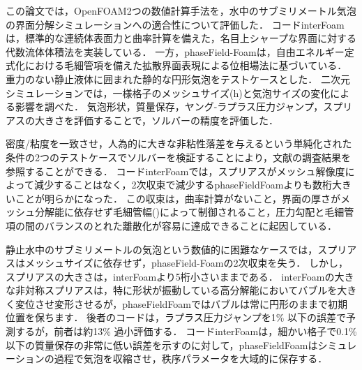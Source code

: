 この論文では，OpenFOAM2つの数値計算手法を，水中のサブミリメートル気泡の界面分解シミュレーションへの適合性について評価した．
コードinterFoamは，標準的な連続体表面力と曲率計算を備えた，名目上シャープな界面に対する代数流体体積法を実装している．
一方，phaseField-Foamは，自由エネルギー定式化における毛細管項を備えた拡散界面表現による位相場法に基づいている．
重力のない静止液体に囲まれた静的な円形気泡をテストケースとした．
二次元シミュレーションでは，一様格子のメッシュサイズ(h)と気泡サイズの変化による影響を調べた．
気泡形状，質量保存，ヤング-ラプラス圧力ジャンプ，スプリアスの大きさを評価することで，ソルバーの精度を評価した．

密度/粘度を一致させ，人為的に大きな非粘性落差を与えるという単純化された条件の2つのテストケースでソルバーを検証することにより，文献の調査結果を参照することができる．
コードinterFoamでは，スプリアスがメッシュ解像度によって減少することはなく，2次収束で減少するphaseFieldFoamよりも数桁大きいことが明らかになった．
この収束は，曲率計算がないこと，界面の厚さがメッシュ分解能に依存せず毛細管幅(\epsilon )によって制御されること，圧力勾配と毛細管項の間のバランスのとれた離散化が容易に達成できることに起因している．

静止水中のサブミリメートルの気泡という数値的に困難なケースでは，スプリアスはメッシュサイズに依存せず，phaseField-Foamの2次収束を失う．
しかし，スプリアスの大きさは，interFoamより5桁小さいままである．
interFoamの大きな非対称スプリアスは，特に形状が振動している高分解能においてバブルを大きく変位させ変形させるが，phaseFieldFoamではバブルは常に円形のままで初期位置を保ちます．
後者のコードは，ラプラス圧力ジャンプを1\% 以下の誤差で予測するが，前者は約13\% 過小評価する．
コードinterFoamは，細かい格子で0.1\% 以下の質量保存の非常に低い誤差を示すのに対して，phaseFieldFoamはシミュレーションの過程で気泡を収縮させ，秩序パラメータを大域的に保存する．

